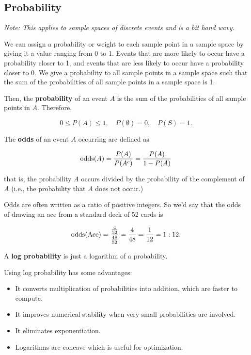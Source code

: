 \documentclass{article}
\begin{document}
\subsection{Probability}

\begin{definition}[Probability]
\emph{Note: This applies to sample spaces of discrete events and is a bit hand wavy.}

We can assign a probability or weight to each sample point in a \@{sample space} by giving it a value ranging from 0 to 1. \@{Events} that are more likely to occur have a probability closer to 1, and events that are less likely to occur have a probability closer to 0. We give a probability to all sample points in a sample space such that the sum of the probabilities of all sample points in a sample space is 1.

Then, the \textbf{probability} of an event $A$ is the sum of the probabilities of all sample points in $A.$ Therefore,

\[ 0 \leq P(A) \leq 1, \quad P(\emptyset) = 0, \quad P(S) = 1. \]
\end{definition}

\begin{definition}[Odds]
The \textbf{odds} of an \@{event} $A$ occurring are defined as

	\[ \operatorname{odds}(A) = \frac{P(A)}{P(A^c)} = \frac{P(A)}{1 - P(A)} \]

that is, the \@{probability} $A$ occurs divided by the probability of the \@{complement} of $A$ (i.e., the probability that $A$ does not occur.)
\end{definition}
\begin{note}
\@{Odds} are often written as a \@{ratio} of positive \@{integers}. So we'd say that the odds of drawing an ace from a standard deck of 52 cards is

\[ \operatorname{odds}(\text{Ace}) = \frac{\frac{4}{52}}{\frac{48}{52}} = \frac{4}{48} = \frac{1}{12} = 1 : 12. \]

\end{note}

\begin{definition}
	A \textbf{log probability} is just a \@{logarithm} of a \@{probability}.
\end{definition}
\begin{note}
Using \@{log probability} has some advantages:
\begin{itemize}
\item It converts multiplication of probabilities into addition, which are faster to compute.
\item It improves \@{numerical stability} when very small probabilities are involved.
\item It eliminates \@{exponentiation}.
\item \@{Logarithms} are \@{concave} which is useful for \@{optimization}.
\end{itemize}
\end{note}
\end{document}
